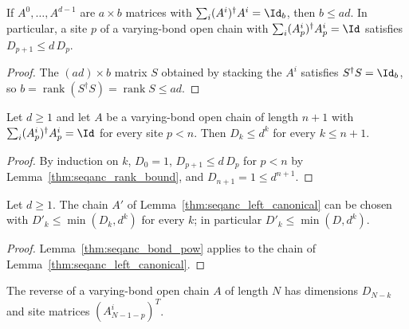 \begin{lemma}
    \label{thm:seqanc_rank_bound}
    \leanok
    If $A^0,\dots,A^{d-1}$ are $a\times b$ matrices with
    $\sum_i(A^i)^\dagger A^i=\Id_b$, then $b\le ad$. In particular, a site $p$
    of a varying-bond open chain with $\sum_i(A_p^i)^\dagger A_p^i=\Id$
    satisfies $D_{p+1}\le d\,D_p$.
\end{lemma}
\begin{proof}
    \leanok
    The $(ad)\times b$ matrix $S$ obtained by stacking the $A^i$ satisfies
    $S^\dagger S=\Id_b$, so $b=\operatorname{rank}(S^\dagger S)
        =\operatorname{rank}S\le ad$.
\end{proof}

\begin{lemma}
    \label{thm:seqanc_bond_pow}
    \leanok
    Let $d\ge 1$ and let $A$ be a varying-bond open chain of length $n+1$ with
    $\sum_i(A_p^i)^\dagger A_p^i=\Id$ for every site $p<n$. Then
    $D_k\le d^k$ for every $k\le n+1$.
\end{lemma}
\begin{proof}
    \leanok
    By induction on $k$, $D_0=1$, $D_{p+1}\le d\,D_p$ for $p<n$ by
    Lemma~\ref{thm:seqanc_rank_bound}, and $D_{n+1}=1\le d^{n+1}$.
\end{proof}

\begin{lemma}
    \label{thm:seqanc_resources}
    \leanok
    Let $d\ge 1$. The chain $A'$ of Lemma~\ref{thm:seqanc_left_canonical}
    can be chosen with $D'_k\le\min(D_k,d^k)$ for every $k$; in particular
    $D'_k\le\min(D,d^k)$.
\end{lemma}
\begin{proof}
    \leanok
    Lemma~\ref{thm:seqanc_bond_pow} applies to the chain of
    Lemma~\ref{thm:seqanc_left_canonical}.
\end{proof}

\begin{definition}
    \label{def:seqanc_reverse}
    \leanok
    The reverse of a varying-bond open chain $A$ of length $N$ has dimensions
    $D_{N-k}$ and site matrices $(A_{N-1-p}^i)^T$.
\end{definition}


